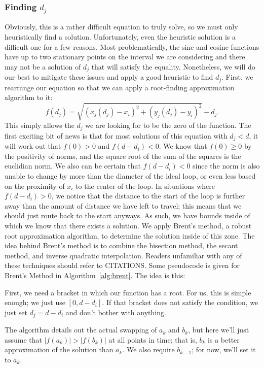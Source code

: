 \documentclass[twocolumn,11pt]{article}
\begin{document}
\subsubsection{Finding $d_j$}
Obviously, this is a rather difficult equation to truly solve, so we must only
heuristically find a solution. Unfortunately, even the heuristic solution is
a difficult one for a few reasons. Most problematically, the sine and cosine
functions have up to two stationary points on the interval we are considering
and there may not be a solution of $d_j$ that will satisfy the equality.
Nonetheless, we will do our best to mitigate these issues and apply a good
heuristic to find $d_j$. First, we rearrange our equation so that we can apply
a root-finding approximation algorithm to it:
\begin{equation}
  f(d_j) = \sqrt{(x_j(d_j) - x_i)^2 + (y_j(d_j) - y_i)^2} - d_j. \label{eq:dj}
\end{equation}
This simply allows the $d_j$ we are looking for to be the zero of the function.
The first exciting bit of news is that for most solutions of this equation with
$d_j < d$, it will work out that $f(0) > 0$ and $f(d-d_i) < 0$.
We know that $f(0) \geq 0$ by the
positivity of norms, and the square root of the sum of the squares is the
euclidian norm. We also can be certain that $f(d-d_i) < 0$ since
the norm is also unable to change by more than the diameter
of the ideal loop, or even less based on the proximity of $x_i$ to the center of
the loop. In situations where $f(d-d_i) > 0$, we notice that the distance to the
start of the loop is further away than the amount of distance we have left to
travel; this means that we should just route back to the start anyways. As such,
we have bounds inside of which we know that there exists a solution. We apply
Brent's method, a robust root approximation algorithm, to determine the solution
inside of this zone. The idea behind Brent's method is to combine the bisection
method, the secant method, and inverse quadratic interpolation. Readers
unfamiliar with any of these techniques should refer to CITATIONS. Some
pseudocode is given for Brent's Method in Algorithm~\ref{alg:brent}. The idea
is this:

First, we need a bracket in which our function has a root. For us, this is
simple enough; we just use $[0, d-d_i]$. If that bracket does not satisfy the
condition, we just set $d_j = d-d_i$ and don't bother with anything.

The algorithm details out the actual swapping of $a_k$ and $b_k$, but here
we'll just assume that $|f(a_k)| > |f(b_k)|$ at all points in time; that is,
$b_k$ is a better approximation of the solution than $a_k$. We also require
$b_{k-1}$; for now, we'll set it to $a_k$.
\end{document}
